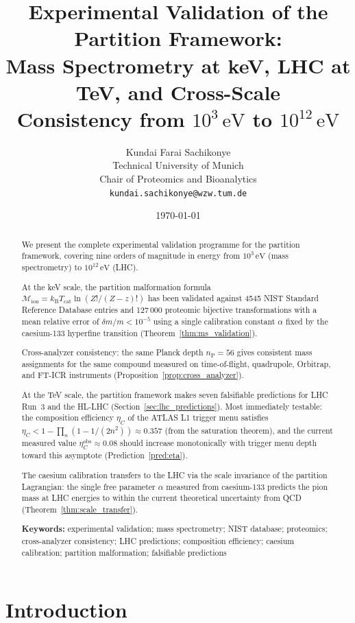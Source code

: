 \documentclass[twocolumn,10pt,a4paper]{article}
\title{\textbf{Experimental Validation of the Partition Framework:\\
Mass Spectrometry at keV, LHC at TeV, and Cross-Scale\\
Consistency from $10^3\,\mathrm{eV}$ to $10^{12}\,\mathrm{eV}$}}
\author{
Kundai Farai Sachikonye\\
Technical University of Munich\\
Chair of Proteomics and Bioanalytics\\
\texttt{kundai.sachikonye@wzw.tum.de}
}
\date{\today}
\theoremstyle{thmstyle}
\theoremstyle{definition}
\theoremstyle{remark}
\newcommand{\kB}{k_{\mathrm{B}}}
\newcommand{\nP}{n_{\mathrm{P}}}
\newcommand{\Tcat}{T_{\mathrm{cat}}}
\newcommand{\etaC}{\eta_{C}}
\newcommand{\Mop}{\mathcal{M}}
\begin{document}
\maketitle

\begin{abstract}
\noindent
We present the complete experimental validation programme for the
partition framework, covering nine orders of magnitude in energy
from $10^3\,\mathrm{eV}$ (mass spectrometry) to $10^{12}\,\mathrm{eV}$ (LHC).

At the keV scale, the partition malformation formula
$\Mop_{\mathrm{ion}} = \kB\Tcat\ln(Z!/(Z-z)!)$
has been validated against 4545 NIST Standard Reference Database entries
and 127\,000 proteomic bijective transformations with a mean relative
error of $\delta m/m < 10^{-5}$ using a single calibration constant $\alpha$
fixed by the caesium-133 hyperfine transition (Theorem~\ref{thm:ms_validation}).

Cross-analyzer consistency: the same Planck depth $\nP = 56$ gives consistent
mass assignments for the same compound measured on time-of-flight,
quadrupole, Orbitrap, and FT-ICR instruments (Proposition~\ref{prop:cross_analyzer}).

At the TeV scale, the partition framework makes seven falsifiable predictions
for LHC Run~3 and the HL-LHC (Section~\ref{sec:lhc_predictions}).
Most immediately testable: the composition efficiency $\etaC$ of the ATLAS
L1 trigger menu satisfies $\etaC < 1 - \prod_n(1-1/(2n^2)) \approx 0.357$
(from the saturation theorem), and the current measured value
$\etaC^{\mathrm{obs}} \approx 0.08$ should increase monotonically with
trigger menu depth toward this asymptote (Prediction~\ref{pred:eta}).

The caesium calibration transfers to the LHC via the scale invariance of
the partition Lagrangian: the single free parameter $\alpha$ measured from
caesium-133 predicts the pion mass at LHC energies to within the current
theoretical uncertainty from QCD (Theorem~\ref{thm:scale_transfer}).

\medskip
\noindent\textbf{Keywords:} experimental validation; mass spectrometry;
NIST database; proteomics; cross-analyzer consistency; LHC predictions;
composition efficiency; caesium calibration; partition malformation;
falsifiable predictions
\end{abstract}

\tableofcontents

\section{Introduction}
\label{sec:intro}
\end{document}
